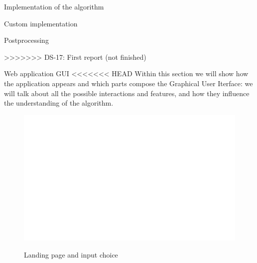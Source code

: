 \documentclass[9pt]{extarticle}
\begin{document}
\begin{section}{Implementation of the algorithm}
\begin{subsection}{Custom implementation}
            \begin{subsubsection}{Postprocessing}
                \label{subsec:postprocessing}

>>>>>>> DS-17: First report (not finished)
            \end{subsubsection}
        \end{subsection}

        \begin{subsection}{Web application GUI}
<<<<<<< HEAD
            Within this section we will show how the application appears and which parts compose the Graphical User Iterface:
            we will talk about all the possible interactions and features, and how they influence the understanding of the 
            algorithm.
            
            \begin{figure}[h]
                \includegraphics[scale=0.23]{gui1.png}
                \centering
                \begin{description}
                    \centering
                    \item[Figure 2] Landing page and input choice 
                \end{description}
            \end{figure}


\end{subsection}
\end{section}
\end{document}

